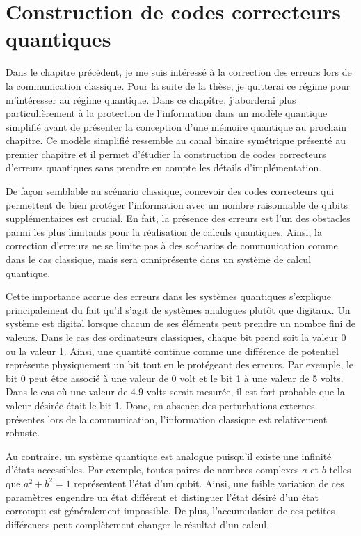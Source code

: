 \begin{comment}
\end{comment}

\chapter{Construction de codes correcteurs quantiques}
\label{chap:construction_codes}

Dans le chapitre précédent, 
je me suis intéressé à la correction des erreurs lors de la communication classique.
Pour la suite de la thèse,
je quitterai ce régime pour m'intéresser au régime quantique.
Dans ce chapitre, 
j'aborderai plus particulièrement à la protection de l'information 
dans un modèle quantique simplifié avant de présenter la conception d'une mémoire 
quantique au prochain chapitre.
Ce modèle simplifié ressemble au canal binaire symétrique présenté au premier chapitre
et il permet d'étudier la construction de codes correcteurs d'erreurs quantiques sans prendre en compte les détails d'implémentation.

De façon semblable au scénario classique,
concevoir des codes correcteurs qui permettent de bien protéger l'information avec un nombre raisonnable de qubits supplémentaires est crucial.
En fait,
la présence des erreurs est l'un des obstacles parmi les plus
limitants pour la réalisation de calculs quantiques.
Ainsi, 
la correction d'erreurs ne se limite pas à des scénarios de communication 
comme dans le cas classique,
mais sera omniprésente dans un système de calcul quantique.

Cette importance accrue des erreurs dans les systèmes quantiques s'explique
principalement du fait qu'il s'agit de systèmes analogues plutôt que digitaux.
Un système est digital lorsque chacun de ses éléments peut prendre un nombre fini
de valeurs. 
Dans le cas des ordinateurs classiques,
chaque bit prend soit la valeur 0 ou la valeur 1.
Ainsi,
une quantité continue comme une différence de potentiel représente physiquement un bit tout en le protégeant des erreurs.
Par exemple,
le bit 0 peut être associé à une valeur de 0 volt et le bit 1 à une valeur de 5 volts.
Dans le cas où une valeur de 4.9 volts serait mesurée, il est fort probable que 
la valeur désirée était le bit 1.
Donc, en absence des perturbations externes présentes lors de la communication,
l'information classique est relativement robuste.

Au contraire, un système quantique est analogue puisqu'il existe une infinité d'états accessibles.
Par exemple, toutes paires de nombres complexes $a$ et $b$ telles que $a^2 + b^2 = 1$
représentent l'état d'un qubit.
Ainsi, 
une faible variation de ces paramètres engendre un état différent
et distinguer l'état désiré d'un état corrompu est généralement impossible.
De plus, l'accumulation de ces petites différences peut complètement
changer le résultat d'un calcul.

